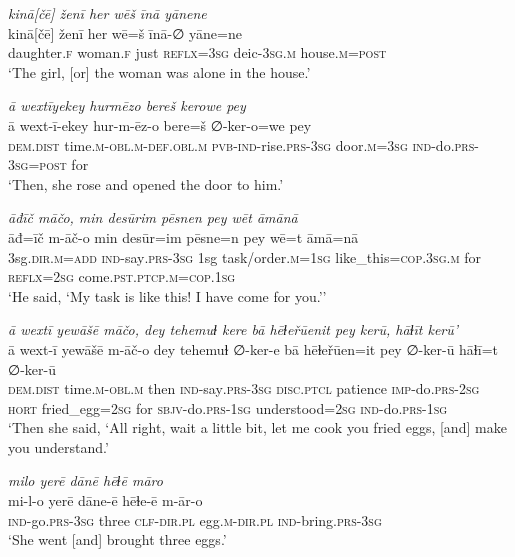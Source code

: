 \ea \label{ŽH.74}
\textit{kinā[čē] ženī her wēš īnā yānene} \\ 
\gll kinā[čē] ženī her wē=š īnā-∅ yāne=ne \\ 
 daughter\textsc{\textsc{.f}} woman\textsc{\textsc{.f}} just \textsc{reflx}\textsc{=3sg} deic\textsc{-3sg}\textsc{.m} house\textsc{.m}\textsc{=\textsc{post}} \\ 
\glt `The girl, [or] the woman was alone in the house.'
\z 
 
\ea \label{ŽH.75}
\textit{ā wextīyekey hurmēzo bereš kerowe pey} \\ 
\gll ā wext-ī-ekey hur-m-ēz-o bere=š ∅-ker-o=we pey \\ 
 \textsc{dem.dist} time\textsc{.m}\textsc{-obl}\textsc{.m}\textsc{-def}\textsc{.obl}\textsc{.m} \textsc{pvb-}\textsc{ind-}rise\textsc{.prs}\textsc{-3sg} door\textsc{.m}\textsc{=3sg} \textsc{ind-}do\textsc{.prs}\textsc{-3sg}\textsc{=\textsc{post}} for \\ 
\glt `Then, she rose and opened the door to him.'
\z 
 
\ea \label{ŽH.78}
\textit{āđīč māčo, min desūrim pēsnen pey wēt āmānā} \\ 
\gll āđ=īč m-āč-o min desūr=im pēsne=n pey wē=t āmā=nā \\ 
 3sg\textsc{.dir}\textsc{.m}\textsc{=add} \textsc{ind-}say\textsc{.prs}\textsc{-3sg} 1sg task/order\textsc{.m}\textsc{=1sg} like\_this\textsc{=cop}\textsc{.3sg}\textsc{.m} for \textsc{reflx}\textsc{=\textsc{2sg}} come\textsc{.pst}\textsc{.ptcp}\textsc{.m}\textsc{=cop}\textsc{.1sg} \\ 
\glt `He said, ‘My task is like this! I have come for you.’'
\z 
 
\ea \label{ŽH.79}
\textit{ā wextī yewāšē māčo, dey tehemuɫ kere bā hēɫeřūenit pey kerū, hāɫīt kerū'} \\ 
\gll ā wext-ī yewāšē m-āč-o dey tehemuɫ ∅-ker-e bā hēɫeřūen=it pey ∅-ker-ū hāɫī=t ∅-ker-ū \\ 
 \textsc{dem.dist} time\textsc{.m}\textsc{-obl}\textsc{.m} then \textsc{ind-}say\textsc{.prs}\textsc{-3sg} \textsc{disc.ptcl} patience \textsc{imp-}do\textsc{.prs}-\textsc{2sg} \textsc{hort} fried\_egg\textsc{=\textsc{2sg}} for \textsc{sbjv-}do\textsc{.prs}\textsc{-1sg} understood\textsc{=\textsc{2sg}} \textsc{ind-}do\textsc{.prs}\textsc{-1sg} \\ 
\glt `Then she said, ‘All right, wait a little bit, let me cook you fried eggs, [and] make you understand.'
\z 
 
\ea \label{ŽH.81}
\textit{milo yerē dānē hēɫē māro} \\ 
\gll mi-l-o yerē dāne-ē hēɫe-ē m-ār-o \\ 
 \textsc{ind-}go\textsc{.prs}\textsc{-3sg} three \textsc{clf}\textsc{-dir}\textsc{.pl} egg\textsc{.m}\textsc{-dir}\textsc{.pl} \textsc{ind-}bring\textsc{.prs}\textsc{-3sg} \\ 
\glt `She went [and] brought three eggs.'
\z 
 
